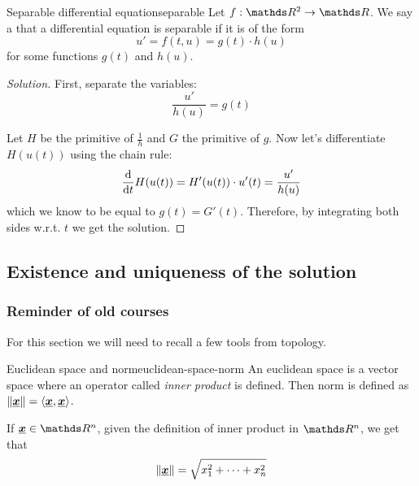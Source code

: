 \documentclass[12pt]{extarticle}
\renewcommand{\vec}[1]{\uvec{#1}}
\begin{document}
\begin{definition}{Separable differential equation}{separable}
    Let $f: \R^2 \to \R$.
    We say a that a differential equation is separable if it is of the form
    \begin{equation}
        u' = f(t, u) = g(t) \cdot h(u)
    \end{equation}
    for some functions $g(t)$ and $h(u)$.
\end{definition}

\begin{proof}[Solution]
    First, separate the variables:
    \begin{equation}
        \frac{u'}{h(u)} = g(t)
    \end{equation}

    Let $H$ be the primitive of $\frac{1}{h}$ and $G$ the primitive of $g$.
    Now let's differentiate $H(u(t))$ using the chain rule:
    \begin{equation}
        \dv{t} H(u(t)) = H'(u(t)) \cdot u'(t) = \frac{u'}{h(u)}
    \end{equation}
    which we know to be equal to $g(t) = G'(t)$.
    Therefore, by integrating both sides w.r.t. $t$ we get the solution.
\end{proof}

\subsection{Existence and uniqueness of the solution}

\subsubsection{Reminder of old courses}

For this section we will need to recall a few tools from topology.

\begin{definition}{Euclidean space and norm}{euclidean-space-norm}
    An euclidean space is a vector space where an operator called \textit{inner product} is defined.
    Then norm is defined as $\norm{\vec x} = \langle \vec x, \vec x \rangle$.

    If $\vec x \in \R^n$, given the definition of inner product in $\R^n$, we get that
    \begin{equation}
        \norm{\vec x} = \sqrt{x_1^2 + \dots + x_n^2}
    \end{equation}
\end{definition}
\end{document}
